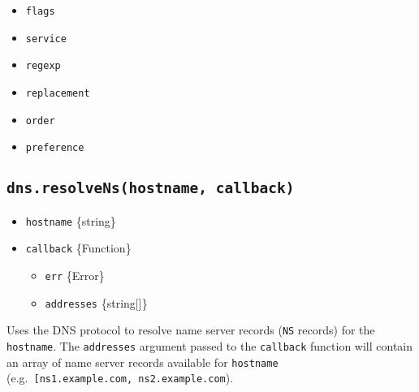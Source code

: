 \begin{itemize}
\tightlist
\item
  \texttt{flags}
\item
  \texttt{service}
\item
  \texttt{regexp}
\item
  \texttt{replacement}
\item
  \texttt{order}
\item
  \texttt{preference}
\end{itemize}

\begin{Shaded}
\begin{Highlighting}[]
\NormalTok{\{}
  \OperatorTok{:} \OperatorTok{,}
  \OperatorTok{:} \OperatorTok{,}
  \OperatorTok{:} \StringTok{\textquotesingle{}\textquotesingle{}}\OperatorTok{,}
  \OperatorTok{:} \OperatorTok{,}
  \OperatorTok{:} \OperatorTok{,}
  \OperatorTok{:} 
\NormalTok{\}}
\end{Highlighting}
\end{Shaded}

\subsection{\texorpdfstring{\texttt{dns.resolveNs(hostname,\ callback)}}{dns.resolveNs(hostname, callback)}}\label{dns.resolvenshostname-callback}

\begin{itemize}
\tightlist
\item
  \texttt{hostname} \{string\}
\item
  \texttt{callback} \{Function\}

  \begin{itemize}
  \tightlist
  \item
    \texttt{err} \{Error\}
  \item
    \texttt{addresses} \{string{[}{]}\}
  \end{itemize}
\end{itemize}

Uses the DNS protocol to resolve name server records (\texttt{NS}
records) for the \texttt{hostname}. The \texttt{addresses} argument
passed to the \texttt{callback} function will contain an array of name
server records available for \texttt{hostname}
(e.g.~\texttt{{[}\textquotesingle{}ns1.example.com\textquotesingle{},\ \textquotesingle{}ns2.example.com\textquotesingle{}{]}}).

